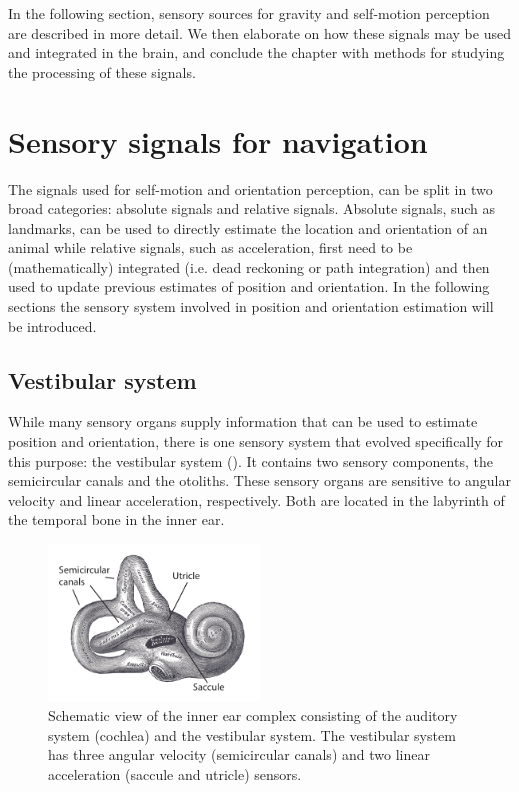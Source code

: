 In the following section, sensory sources for gravity and self-motion perception are described in more detail. We then elaborate on how these signals may be used and integrated in the brain, and conclude the chapter with methods for studying the processing of these signals. 
 


\section{Sensory signals for navigation}

The signals used for self-motion and orientation perception, can be split in two broad categories: absolute signals and relative signals. Absolute signals, such as landmarks, can be used to directly estimate the location and orientation of an animal while relative signals, such as acceleration, first need to be (mathematically) integrated (i.e. dead reckoning or path integration) and then used to update previous estimates of position and orientation. In the following sections the sensory system involved in position and orientation estimation will be introduced.

\subsection{Vestibular system}

While many sensory organs supply information that can be used to estimate position and orientation, there is one sensory system that evolved specifically for this purpose: the vestibular system (). It contains two sensory components, the semicircular canals and the otoliths. These sensory organs are sensitive to angular velocity and linear acceleration, respectively. Both are located in the labyrinth of the temporal bone in the inner ear.

\begin{figure}
    \includegraphics[width=0.5\textwidth]{src/intro/figures/vestibular.pdf}
    \caption{Schematic view of the inner ear complex consisting of the auditory system (cochlea) and the vestibular system. The vestibular system has three angular velocity (semicircular canals) and two linear acceleration (saccule and utricle) sensors.}
    \label{intro:vestibular}
\end{figure}


